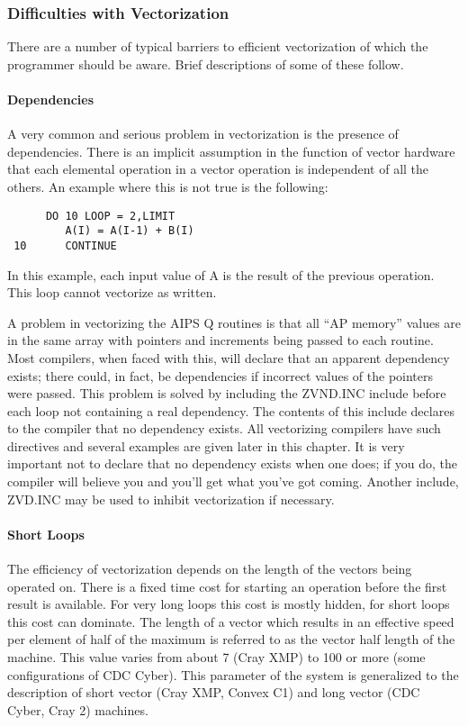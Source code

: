 \subsubsection{Difficulties with Vectorization }
There are a number of typical barriers to efficient vectorization of
which the programmer should be aware.  Brief descriptions of some of
these follow.

\paragraph{Dependencies }
A very common and serious problem in vectorization is the presence of
dependencies. There is an implicit assumption in the function of
vector hardware that each elemental operation in a vector operation is
independent of all the others. An example where this is not true is
the following:
\begin{verbatim}
      DO 10 LOOP = 2,LIMIT
         A(I) = A(I-1) + B(I)
 10      CONTINUE
\end{verbatim}
In this example, each input value of A is the result of the previous
operation.  This loop cannot vectorize as written.

A problem in vectorizing the AIPS Q routines is that all ``AP memory''
values are in the same array with pointers and increments being passed
to each routine. Most compilers, when faced with this, will declare
that an apparent dependency exists; there could, in fact, be
dependencies if incorrect values of the pointers were passed. This
problem is solved by including the ZVND.INC include before each loop
not containing a real dependency. The contents of this include
declares to the compiler that no dependency exists. All vectorizing
compilers have such directives and several examples are given later in
this chapter.  It is very important not to declare that no dependency
exists when one does;  if you do, the compiler will believe you and
you'll get what you've got coming.  Another include, ZVD.INC may be
used to inhibit vectorization if necessary.

\paragraph{Short Loops }
The efficiency of vectorization depends on the length of the vectors
being operated on.  There is a fixed time cost for starting an
operation before the first result is available.  For very long loops
this cost is mostly hidden, for short loops this cost can dominate.
The length of a vector which results in an effective speed per element
of half of the maximum is referred to as the vector half length of the
machine. This value varies from about 7 (Cray XMP) to 100 or more
(some configurations of CDC Cyber).  This parameter of the system is
generalized to the description of short vector (Cray XMP, Convex C1)
and long vector (CDC Cyber, Cray 2) machines.

